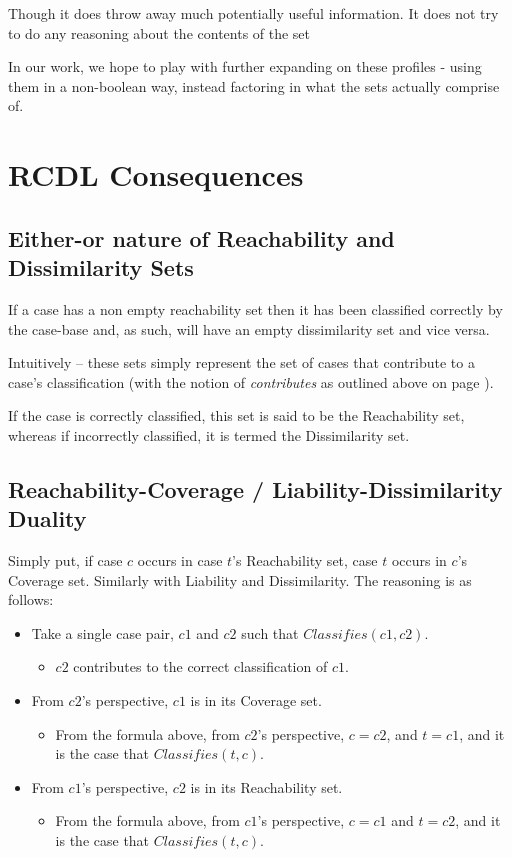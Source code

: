 \documentclass[a4paper,11pt]{report}
\begin{document}
Though it does throw away much potentially useful information. It does not try to do any reasoning about the contents of the set

In our work, we hope to play with further expanding on these profiles - using them in a non-boolean way, instead factoring in what the sets actually comprise of.

\section{RCDL Consequences}

\subsection{Either-or nature of Reachability and Dissimilarity Sets}
If a case has a non empty reachability set then it has been classified correctly by the case-base and, as such, will have an empty dissimilarity set and vice versa.

Intuitively – these sets simply represent the set of cases that contribute to a case's classification (with the notion of \emph{contributes} as outlined above on page \pageref{sec:contributes}). 

If the case is correctly classified, this set is said to be the Reachability set, whereas if incorrectly classified, it is termed the Dissimilarity set.

\subsection{Reachability-Coverage / Liability-Dissimilarity Duality}
Simply put, if case $c$ occurs in case $t$'s Reachability set, case $t$ occurs in $c$'s Coverage set. Similarly with Liability and Dissimilarity.
The reasoning is as follows:
\begin{itemize}
	\item Take a single case pair, $c1$ and $c2$ such that $Classifies(c1, c2)$.
	\begin{itemize}
		\item $c2$ contributes to the correct classification of $c1$.
	\end{itemize}
	\item From $c2$'s perspective, $c1$ is in its Coverage set.
	\begin{itemize}
		\item From the formula above, from $c2$'s perspective, $c=c2$, and $t=c1$, and it is the case that $Classifies(t, c)$.
	\end{itemize}
	\item From $c1$'s perspective, $c2$ is in its Reachability set.
	\begin{itemize}
		\item From the formula above, from $c1$'s perspective, $c=c1$ and $t=c2$, and it is the case that $Classifies(t, c)$.
	\end{itemize}
\end{itemize}
\end{document}
